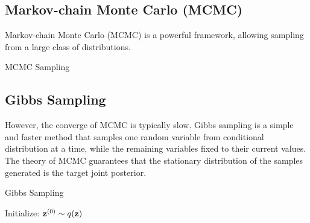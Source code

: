 \subsection{Markov-chain Monte Carlo (MCMC)}
Markov-chain Monte Carlo (MCMC) is a powerful framework, allowing sampling from a large class of distributions.

\begin{algorithm}[h]
 \caption{MCMC Sampling}
\SetAlgoLined
 
\end{algorithm}

\subsection{Gibbs Sampling}
However, the converge of MCMC is typically slow. Gibbs sampling is a simple and faster method that samples one random variable from conditional distribution at a time, while the remaining variables fixed to their current values.
The theory of MCMC guarantees that the stationary distribution of the samples generated is the target joint posterior. 

\begin{algorithm}[H]
 \caption{Gibbs Sampling}
\SetAlgoLined
 Initialize: $ \mathbf{z}^{(0)} \sim q(\mathbf{z})$\;
\end{algorithm}

